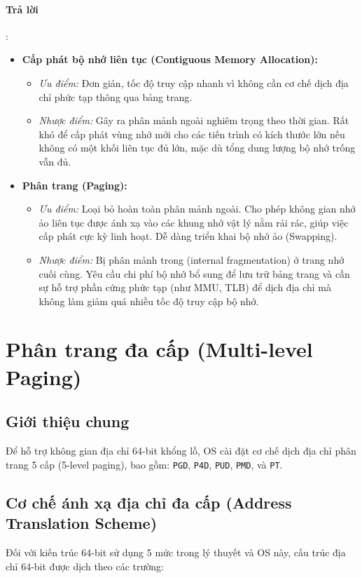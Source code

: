 \documentclass[a4paper]{article}
\begin{document}
\paragraph{Trả lời}:
\begin{itemize}
    \item \textbf{Cấp phát bộ nhớ liên tục (Contiguous Memory Allocation):}
          \begin{itemize}
              \item \textit{Ưu điểm:} Đơn giản, tốc độ truy cập nhanh vì không cần cơ chế dịch địa chỉ phức tạp thông qua bảng trang.
              \item \textit{Nhược điểm:} Gây ra phân mảnh ngoài nghiêm trọng theo thời gian. Rất khó để cấp phát vùng nhớ mới cho các tiến trình có kích thước lớn nếu không có một khối liên tục đủ lớn, mặc dù tổng dung lượng bộ nhớ trống vẫn đủ.
          \end{itemize}
    \item \textbf{Phân trang (Paging):}
          \begin{itemize}
              \item \textit{Ưu điểm:} Loại bỏ hoàn toàn phân mảnh ngoài. Cho phép không gian nhớ ảo liên tục được ánh xạ vào các khung nhớ vật lý nằm rải rác, giúp việc cấp phát cực kỳ linh hoạt. Dễ dàng triển khai bộ nhớ ảo (Swapping).
              \item \textit{Nhược điểm:} Bị phân mảnh trong (internal fragmentation) ở trang nhớ cuối cùng. Yêu cầu chi phí bộ nhớ bổ sung để lưu trữ bảng trang và cần sự hỗ trợ phần cứng phức tạp (như MMU, TLB) để dịch địa chỉ mà không làm giảm quá nhiều tốc độ truy cập bộ nhớ.
          \end{itemize}
\end{itemize}

\pagebreak

\section{Phân trang đa cấp (Multi-level Paging)}

\subsection{Giới thiệu chung}
Để hỗ trợ không gian địa chỉ 64-bit khổng lồ, OS cài đặt cơ chế dịch địa chỉ phân trang 5 cấp (5-level paging), bao gồm: \texttt{PGD}, \texttt{P4D}, \texttt{PUD}, \texttt{PMD}, và \texttt{PT}.

\subsection{Cơ chế ánh xạ địa chỉ đa cấp (Address Translation Scheme)}
Đối với kiến trúc 64-bit sử dụng 5 mức trong lý thuyết và OS này, cấu trúc địa chỉ 64-bit được dịch theo các trường:
\end{document}
